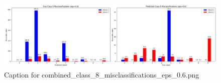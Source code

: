 \documentclass[11pt,onside]{article}
\begin{document}
\begin{figure}[ht]
\centering
\includegraphics[width=1\textwidth]{combined_class_boundary_pgd/combined_class_8_misclassifications_eps_0.6.png}
\caption{Caption for combined_class_8_misclassifications_eps_0.6.png}
\label{fig:combined_class_8_misclassifications_eps_0.6.png}
\end{figure}
\end{document}
